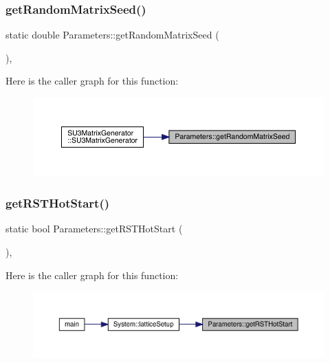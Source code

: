 \subsubsection{\texorpdfstring{getRandomMatrixSeed()}{getRandomMatrixSeed()}}
{\footnotesize\ttfamily static double Parameters\+::get\+Random\+Matrix\+Seed (\begin{DoxyParamCaption}{ }\end{DoxyParamCaption})\hspace{0.3cm}{\ttfamily [inline]}, {\ttfamily [static]}}

Here is the caller graph for this function\+:\nopagebreak
\begin{figure}[H]
\begin{center}
\leavevmode
\includegraphics[width=350pt]{class_parameters_a92d9e73e333b01745747e55d9ae4f7cc_icgraph}
\end{center}
\end{figure}
\mbox{\label{class_parameters_a4c24cb57765589a12eae030894423735}} 
\subsubsection{\texorpdfstring{getRSTHotStart()}{getRSTHotStart()}}
{\footnotesize\ttfamily static bool Parameters\+::get\+R\+S\+T\+Hot\+Start (\begin{DoxyParamCaption}{ }\end{DoxyParamCaption})\hspace{0.3cm}{\ttfamily [inline]}, {\ttfamily [static]}}

Here is the caller graph for this function\+:\nopagebreak
\begin{figure}[H]
\begin{center}
\leavevmode
\includegraphics[width=350pt]{class_parameters_a4c24cb57765589a12eae030894423735_icgraph}
\end{center}
\end{figure}
\mbox{\label{class_parameters_a3b4e197b2569fb5465e0827430e45eb5}} 
